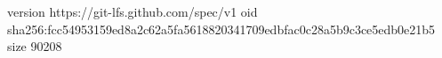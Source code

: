 version https://git-lfs.github.com/spec/v1
oid sha256:fcc54953159ed8a2c62a5fa5618820341709edbfac0c28a5b9c3ce5edb0e21b5
size 90208
